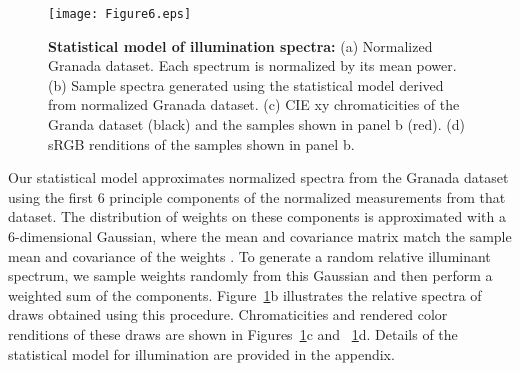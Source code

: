\documentclass{jov}
\begin{document}
\begin{figure}
\centering
\texttt{[image: Figure6.eps]}
    \caption{{\bf Statistical model of illumination spectra:} (a) Normalized Granada dataset. Each spectrum is normalized by its mean power. (b) Sample spectra generated using the statistical model derived from normalized Granada dataset. (c) CIE xy chromaticities of the Granda dataset (black) and the samples shown in panel b (red). (d) sRGB renditions of the samples shown in panel b.}
\label{fig:illuminant}
\end{figure}

Our statistical model approximates normalized spectra from the Granada dataset using the first 6 principle components of the normalized measurements from that dataset.
The distribution of weights on these components is approximated with a 6-dimensional Gaussian, where the mean and covariance matrix match the sample mean and covariance of the weights \cite{BrainardFreeman}. 
To generate a random relative illuminant spectrum, we sample weights randomly from this Gaussian and then perform a weighted sum of the components.
Figure~\ref{fig:illuminant}b illustrates the relative spectra of draws obtained using this procedure.
Chromaticities and rendered color renditions of these draws are shown in Figures~\ref{fig:illuminant}c and ~\ref{fig:illuminant}d.
Details of the statistical model for illumination are provided in the appendix.
\end{document}
